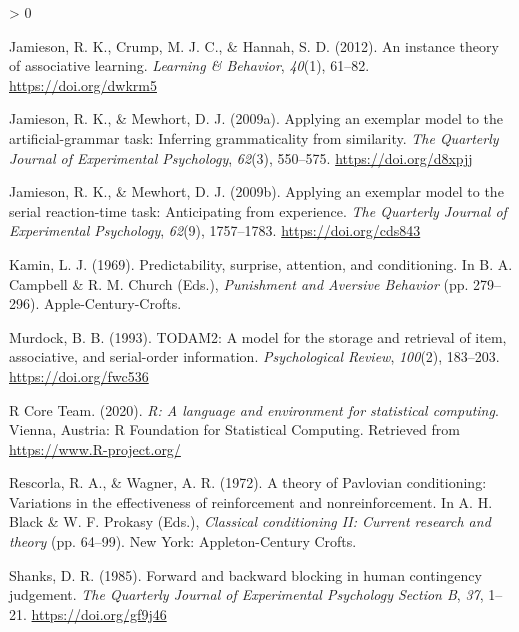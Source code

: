 \documentclass[
  english,
  man,floatsintext]{apa6}
\newlength{\cslhangindent}
\newenvironment{CSLReferences}[2] %
 {%
  \setlength{\parindent}{0pt}
  \ifodd #1 \everypar{\setlength{\hangindent}{\cslhangindent}}\ignorespaces\fi
  \ifnum #2 > 0
  \setlength{\parskip}{#2\baselineskip}
  \fi
 }%
 {}
\begin{document}
\begin{CSLReferences}{1}{0}
\leavevmode\hypertarget{ref-jamiesonInstanceTheoryAssociative2012}{}%
Jamieson, R. K., Crump, M. J. C., \& Hannah, S. D. (2012). An instance theory of associative learning. \emph{Learning \& Behavior}, \emph{40}(1), 61--82. \url{https://doi.org/dwkrm5}

\leavevmode\hypertarget{ref-jamiesonApplyingExemplarModel2009}{}%
Jamieson, R. K., \& Mewhort, D. J. (2009a). Applying an exemplar model to the artificial-grammar task: {Inferring} grammaticality from similarity. \emph{The Quarterly Journal of Experimental Psychology}, \emph{62}(3), 550--575. \url{https://doi.org/d8xpjj}

\leavevmode\hypertarget{ref-jamiesonApplyingExemplarModel2009a}{}%
Jamieson, R. K., \& Mewhort, D. J. (2009b). Applying an exemplar model to the serial reaction-time task: {Anticipating} from experience. \emph{The Quarterly Journal of Experimental Psychology}, \emph{62}(9), 1757--1783. \url{https://doi.org/cds843}

\leavevmode\hypertarget{ref-kaminPredictabilitySurpriseAttention1969}{}%
Kamin, L. J. (1969). Predictability, surprise, attention, and conditioning. In B. A. Campbell \& R. M. Church (Eds.), \emph{Punishment and {Aversive Behavior}} (pp. 279--296). {Apple-Century-Crofts}.

\leavevmode\hypertarget{ref-murdockTODAM2ModelStorage1993}{}%
Murdock, B. B. (1993). {TODAM2}: A model for the storage and retrieval of item, associative, and serial-order information. \emph{Psychological Review}, \emph{100}(2), 183--203. \url{https://doi.org/fwc536}

\leavevmode\hypertarget{ref-R-base}{}%
R Core Team. (2020). \emph{R: A language and environment for statistical computing}. Vienna, Austria: R Foundation for Statistical Computing. Retrieved from \url{https://www.R-project.org/}

\leavevmode\hypertarget{ref-rescorlaTheoryPavlovianConditioning1972}{}%
Rescorla, R. A., \& Wagner, A. R. (1972). A theory of {Pavlovian} conditioning: {Variations} in the effectiveness of reinforcement and nonreinforcement. In A. H. Black \& W. F. Prokasy (Eds.), \emph{Classical conditioning {II}: {Current} research and theory} (pp. 64--99). {New York: Appleton-Century Crofts}.

\leavevmode\hypertarget{ref-shanksForwardBackwardBlocking1985}{}%
Shanks, D. R. (1985). Forward and backward blocking in human contingency judgement. \emph{The Quarterly Journal of Experimental Psychology Section B}, \emph{37}, 1--21. \url{https://doi.org/gf9j46}


\end{CSLReferences}
\end{document}
